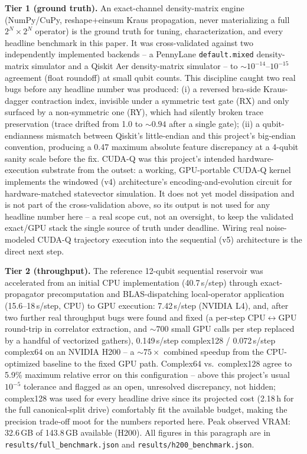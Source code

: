 \documentclass[11pt]{article}
\begin{document}
\textbf{Tier 1 (ground truth).} An exact-channel density-matrix engine (NumPy/CuPy,
reshape+einsum Kraus propagation, never materializing a full $2^N\times2^N$ operator) is the
ground truth for tuning, characterization, and every headline benchmark in this paper. It was
cross-validated against two independently implemented backends -- a PennyLane
\texttt{default.mixed} density-matrix simulator and a Qiskit Aer density-matrix simulator -- to
$\sim\!10^{-14}$--$10^{-15}$ agreement (float roundoff) at small qubit counts. This discipline
caught two real bugs before any headline number was produced: (i) a reversed bra-side Kraus-dagger
contraction index, invisible under a symmetric test gate (RX) and only surfaced by a non-symmetric
one (RY), which had silently broken trace preservation (trace drifted from 1.0 to $\sim\!0.94$
after a single gate); (ii) a qubit-endianness mismatch between Qiskit's little-endian and this
project's big-endian convention, producing a 0.47 maximum absolute feature discrepancy at a
4-qubit sanity scale before the fix. CUDA-Q was this project's intended hardware-execution
substrate from the outset: a working, GPU-portable CUDA-Q kernel implements the windowed (v4)
architecture's encoding-and-evolution circuit for hardware-matched statevector simulation. It
does not yet model dissipation and is not part of the cross-validation above, so its output is
not used for any headline number here -- a real scope cut, not an oversight, to keep the
validated exact/GPU stack the single source of truth under deadline. Wiring real noise-modeled
CUDA-Q trajectory execution into the sequential (v5) architecture is the direct next step.

\textbf{Tier 2 (throughput).} The reference 12-qubit sequential reservoir was accelerated from an
initial CPU implementation (40.7\,s/step) through exact-propagator precomputation and
BLAS-dispatching local-operator application (15.6--18\,s/step, CPU) to GPU execution: 7.42\,s/step
(NVIDIA L4), and, after two further real throughput bugs were found and fixed (a per-step
CPU$\leftrightarrow$GPU round-trip in correlator extraction, and $\sim\!700$ small GPU calls per
step replaced by a handful of vectorized gathers), 0.149\,s/step complex128 / 0.072\,s/step
complex64 on an NVIDIA H200 -- a $\sim\!75\times$ combined speedup from the CPU-optimized baseline
to the fixed GPU path. Complex64 vs.\ complex128 agree to 5.9\% maximum relative error on this
configuration -- above this project's usual $10^{-5}$ tolerance and flagged as an open,
unresolved discrepancy, not hidden; complex128 was used for every headline drive since its
projected cost (2.18\,h for the full canonical-split drive) comfortably fit the available budget,
making the precision trade-off moot for the numbers reported here. Peak observed VRAM: 32.6\,GB
of 143.8\,GB available (H200). All figures in this paragraph are in
\texttt{results/full\_benchmark.json} and \texttt{results/h200\_benchmark.json}.
\end{document}
